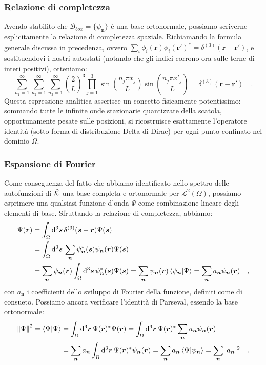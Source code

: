 \subsubsection{Relazione di completezza}
Avendo stabilito che $\mathcal{B}_{box} = \{ \psi_{\bm{n}} \}$ è una base ortonormale, possiamo scriverne esplicitamente la relazione di completezza spaziale. Richiamando la formula generale discussa in precedenza, ovvero $\sum_i \phi_i(\bm{r}) \phi_i(\bm{r}')^* = \delta^{(3)}(\bm{r}-\bm{r}')$, e sostituendovi i nostri autostati (notando che gli indici corrono ora sulle terne di interi positivi), otteniamo:
\begin{equation}
    \sum_{n_1=1}^\infty \sum_{n_2=1}^\infty \sum_{n_3=1}^\infty \left( \frac{2}{L} \right)^3 \prod_{j=1}^3 \sin\left( \frac{n_j \pi x_j}{L} \right) \sin\left( \frac{n_j \pi x'_j}{L} \right) = \delta^{(3)}(\bm{r}-\bm{r}') \quad.
\end{equation}
Questa espressione analitica asserisce un concetto fisicamente potentissimo: sommando tutte le infinite onde stazionarie quantizzate della scatola, opportunamente pesate sulle posizioni, si ricostruisce esattamente l'operatore identità (sotto forma di distribuzione Delta di Dirac) per ogni punto confinato nel dominio $\Omega$.

\subsubsection{Espansione di Fourier}
Come conseguenza del fatto che abbiamo identificato nello spettro delle autofunzioni di $\hat{\mathcal{K}}$ una base completa e ortonormale per $\mathcal{L}^2(\Omega)$, possiamo esprimere una qualsiasi funzione d'onda $\Psi$ come combinazione lineare degli elementi di base. Sfruttando la relazione di completezza, abbiamo:
\[
\begin{aligned}
    \Psi(\bm{r}) &= \int_{\Omega} \dd^3{\bm{s}} \, \delta^{(3)}(\bm{s}-\bm{r}) \Psi(\bm{s}) \\
    &= \int_{\Omega} \dd^3{\bm{s}} \, \sum_{\bm{n}} \psi_{\bm{n}}^*(\bm{s}) \psi_{\bm{n}}(\bm{r}) \Psi(\bm{s}) \\
    &= \sum_{\bm{n}} \psi_{\bm{n}}(\bm{r}) \int_{\Omega} \dd^3{\bm{s}} \, \psi_{\bm{n}}^*(\bm{s}) \Psi(\bm{s}) = \sum_{\bm{n}} \psi_{\bm{n}}(\bm{r}) \braket{\psi_{\bm{n}}}{\Psi} = \sum_{\bm{n}} a_{\bm{n}} \psi_{\bm{n}}(\bm{r}) \quad,
\end{aligned}
\]
con $a_{\bm{n}}$ i coefficienti dello sviluppo di Fourier della funzione, definiti come di consueto. Possiamo ancora verificare l'identità di Parseval, essendo la base ortonormale:
\[
    \begin{aligned}
    \norm{\Psi}^2 = \braket{\Psi}{\Psi} &= \int_{\Omega} \dd^3{\bm{r}} \, \Psi(\bm{r})^* \Psi(\bm{r}) = \int_{\Omega} \dd^3{\bm{r}} \, \Psi(\bm{r})^* \sum_{\bm{n}} a_{\bm{n}} \psi_{\bm{n}}(\bm{r})\\
    &= \sum_{\bm{n}} a_{\bm{n}} \int_{\Omega} \dd^3{\bm{r}} \, \Psi(\bm{r})^*  \psi_{\bm{n}}(\bm{r}) = \sum_{\bm{n}} a_{\bm{n}} \braket{\Psi}{\psi_{\bm{n}}} = \sum_{\bm{n}} |a_{\bm{n}}|^2 \quad.
    \end{aligned}
\]

